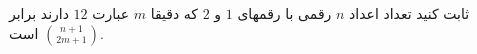 \exercise
ثابت کنيد تعداد اعداد
$n$
 رقمی با رقمهای
$1$
  و
$2$
   که دقيقا
$m$  
    عبارت 
$12$  
     دارند برابر 
$\binom{n+1}{2m+1}$
      است.
